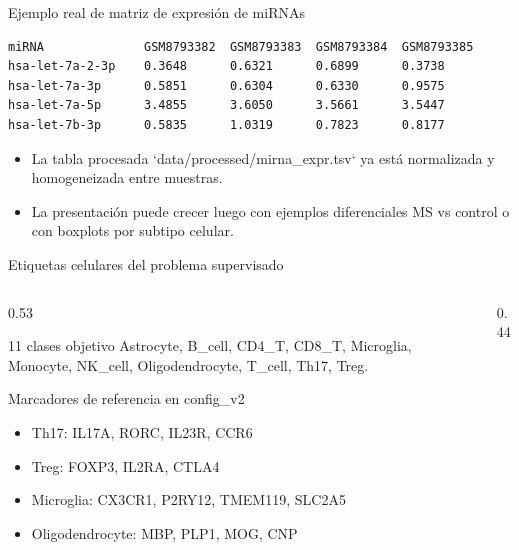 \begin{frame}[fragile]{Ejemplo real de matriz de expresi\'on de miRNAs}
  \scriptsize
  \begin{lstlisting}
miRNA              GSM8793382  GSM8793383  GSM8793384  GSM8793385
hsa-let-7a-2-3p    0.3648      0.6321      0.6899      0.3738
hsa-let-7a-3p      0.5851      0.6304      0.6330      0.9575
hsa-let-7a-5p      3.4855      3.6050      3.5661      3.5447
hsa-let-7b-3p      0.5835      1.0319      0.7823      0.8177
  \end{lstlisting}

  \vspace{0.3em}
  \begin{itemize}
    \item La tabla procesada `data/processed/mirna_expr.tsv` ya est\'a normalizada y homogeneizada entre muestras.
    \item La presentaci\'on puede crecer luego con ejemplos diferenciales MS vs control o con boxplots por subtipo celular.
  \end{itemize}
\end{frame}

\begin{frame}{Etiquetas celulares del problema supervisado}
  \begin{columns}[T]
    \begin{column}{0.53\textwidth}
      \begin{block}{11 clases objetivo}
        \small
        Astrocyte, B\_cell, CD4\_T, CD8\_T, Microglia, Monocyte, NK\_cell, Oligodendrocyte, T\_cell, Th17, Treg.
      \end{block}
      \begin{block}{Marcadores de referencia en config\_v2}
        \small
        \begin{itemize}
          \item Th17: IL17A, RORC, IL23R, CCR6
          \item Treg: FOXP3, IL2RA, CTLA4
          \item Microglia: CX3CR1, P2RY12, TMEM119, SLC2A5
          \item Oligodendrocyte: MBP, PLP1, MOG, CNP
        \end{itemize}
      \end{block}
    \end{column}
    \begin{column}{0.44\textwidth}
    \end{column}
  \end{columns}
\end{frame}

